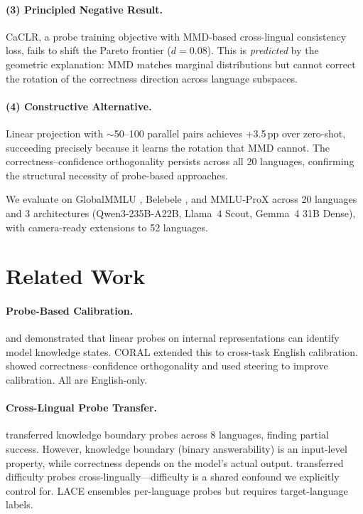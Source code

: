 \documentclass[11pt,a4paper]{article}
\begin{document}
\paragraph{(3) Principled Negative Result.} CaCLR, a probe training objective with MMD-based cross-lingual consistency loss, fails to shift the Pareto frontier ($d = 0.08$). This is \emph{predicted} by the geometric explanation: MMD matches marginal distributions but cannot correct the rotation of the correctness direction across language subspaces.

\paragraph{(4) Constructive Alternative.} Linear projection with $\sim$50--100 parallel pairs achieves +3.5\,pp over zero-shot, succeeding precisely because it learns the rotation that MMD cannot. The correctness--confidence orthogonality persists across all 20 languages, confirming the structural necessity of probe-based approaches.

We evaluate on GlobalMMLU \cite{ahuja2024globalmmlu}, Belebele \cite{bandarkar2023belebele}, and MMLU-ProX across 20 languages and 3 architectures (Qwen3-235B-A22B, Llama~4 Scout, Gemma~4 31B Dense), with camera-ready extensions to 52 languages.

\section{Related Work}
\label{sec:related}

\paragraph{Probe-Based Calibration.}
\citet{burns2023discovering} and \citet{li2024inference} demonstrated that linear probes on internal representations can identify model knowledge states. CORAL \cite{miao2026coral} extended this to cross-task English calibration. \citet{miao2026orthogonality} showed correctness--confidence orthogonality and used steering to improve calibration. All are English-only.

\paragraph{Cross-Lingual Probe Transfer.}
\citet{xiao2025knowledgeboundary} transferred knowledge boundary probes across 8 languages, finding partial success. However, knowledge boundary (binary answerability) is an input-level property, while correctness depends on the model's actual output. \citet{civelli2024difficulty} transferred difficulty probes cross-lingually---difficulty is a shared confound we explicitly control for. LACE \cite{zhou2024lace} ensembles per-language probes but requires target-language labels.
\end{document}
